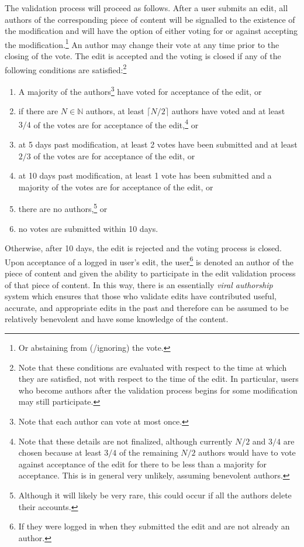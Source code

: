 \documentclass[12pt,letterpaper]{article}
\begin{document}
The validation process will proceed as follows. After a user submits an edit, all authors of the corresponding piece of content will be signalled to the existence of the modification and will have the option of either voting for or against accepting the modification.\footnote{Or abstaining from (/ignoring) the vote.} An author may change their vote at any time prior to the closing of the vote. The edit is accepted and the voting is closed if any of the following conditions are satisfied:\footnote{Note that these conditions are evaluated with respect to the time at which they are satisfied, not with respect to the time of the edit. In particular, users who become authors after the validation process begins for some modification may still participate.}
\begin{enumerate}
\item[1.] A majority of the authors\footnote{Note that each author can vote at most once.} have voted for acceptance of the edit, or
\item[2.] if there are $N \in \mathbb{N}$ authors, at least $\lceil N/2 \rceil$ authors have voted and at least $3/4$ of the votes are for acceptance of the edit,\footnote{Note that these details are not finalized, although currently $N/2$ and $3/4$ are chosen because at least $3/4$ of the remaining $N/2$ authors would have to vote against acceptance of the edit for there to be less than a majority for acceptance. This is in general very unlikely, assuming benevolent authors.} or
\item[3.] at 5 days past modification, at least 2 votes have been submitted and at least $2/3$ of the votes are for acceptance of the edit, or
\item[4.] at 10 days past modification, at least 1 vote has been submitted and a majority of the votes are for acceptance of the edit, or
\item[5.] there are no authors,\footnote{Although it will likely be very rare, this could occur if all the authors delete their accounts.} or
\item[6.] no votes are submitted within 10 days.
\end{enumerate}
Otherwise, after 10 days, the edit is rejected and the voting process is closed. Upon acceptance of a logged in user's edit, the user\footnote{If they were logged in when they submitted the edit and are not already an author.} is denoted an author of the piece of content and given the ability to participate in the edit validation process of that piece of content. In this way, there is an essentially \textit{viral authorship} system which ensures that those who validate edits have contributed useful, accurate, and appropriate edits in the past and therefore can be assumed to be relatively benevolent and have some knowledge of the content. 
\end{document}
